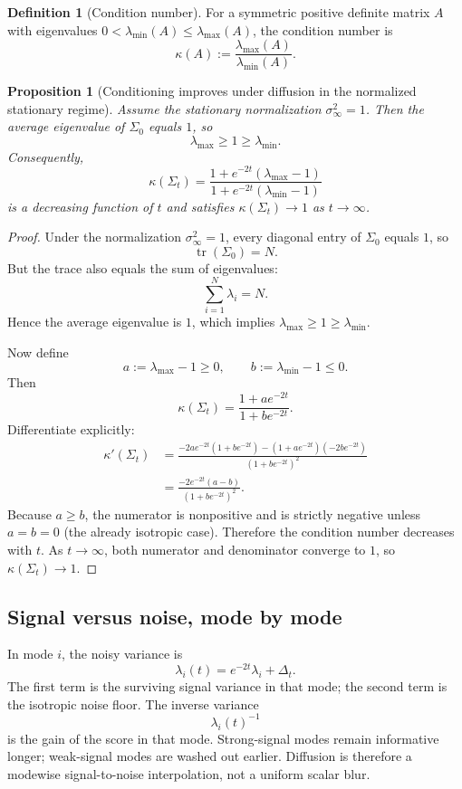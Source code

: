 \documentclass[11pt]{article}
\numberwithin{equation}{section}
\newtheorem{proposition}[theorem]{Proposition}
\theoremstyle{definition}
\newtheorem{definition}[theorem]{Definition}
\theoremstyle{remark}
\begin{document}
\begin{definition}[Condition number]
For a symmetric positive definite matrix $A$ with eigenvalues $0<\lambda_{\min}(A)\leq \lambda_{\max}(A)$, the condition number is
\[
\kappa(A):=\frac{\lambda_{\max}(A)}{\lambda_{\min}(A)}.
\]
\end{definition}

\begin{proposition}[Conditioning improves under diffusion in the normalized stationary regime]\label{prop:cond}
Assume the stationary normalization $\sigma_\infty^2=1$. Then the average eigenvalue of $\Sigma_0$ equals $1$, so
\[
\lambda_{\max}\geq 1\geq \lambda_{\min}.
\]
Consequently,
\[
\kappa(\Sigma_t)=\frac{1+e^{-2t}(\lambda_{\max}-1)}{1+e^{-2t}(\lambda_{\min}-1)}
\]
is a decreasing function of $t$ and satisfies $\kappa(\Sigma_t)\to 1$ as $t\to\infty$.
\end{proposition}

\begin{proof}
Under the normalization $\sigma_\infty^2=1$, every diagonal entry of $\Sigma_0$ equals $1$, so
\[
\operatorname{tr}(\Sigma_0)=N.
\]
But the trace also equals the sum of eigenvalues:
\[
\sum_{i=1}^N\lambda_i=N.
\]
Hence the average eigenvalue is $1$, which implies $\lambda_{\max}\geq 1\geq \lambda_{\min}$.

Now define
\[
a:=\lambda_{\max}-1\geq 0,
\qquad
b:=\lambda_{\min}-1\leq 0.
\]
Then
\[
\kappa(\Sigma_t)=\frac{1+ae^{-2t}}{1+be^{-2t}}.
\]
Differentiate explicitly:
\begin{align*}
\kappa'(\Sigma_t)
&=
\frac{-2ae^{-2t}(1+be^{-2t}) - (1+ae^{-2t})(-2be^{-2t})}{(1+be^{-2t})^2} \\
&=
\frac{-2e^{-2t}(a-b)}{(1+be^{-2t})^2}.
\end{align*}
Because $a\geq b$, the numerator is nonpositive and is strictly negative unless $a=b=0$ (the already isotropic case). Therefore the condition number decreases with $t$. As $t\to\infty$, both numerator and denominator converge to $1$, so $\kappa(\Sigma_t)\to 1$.
\end{proof}

\subsection{Signal versus noise, mode by mode}

In mode $i$, the noisy variance is
\[
\lambda_i(t)=e^{-2t}\lambda_i+\Delta_t.
\]
The first term is the surviving signal variance in that mode; the second term is the isotropic noise floor. The inverse variance
\[
\lambda_i(t)^{-1}
\]
is the gain of the score in that mode. Strong-signal modes remain informative longer; weak-signal modes are washed out earlier. Diffusion is therefore a modewise signal-to-noise interpolation, not a uniform scalar blur.
\end{document}
